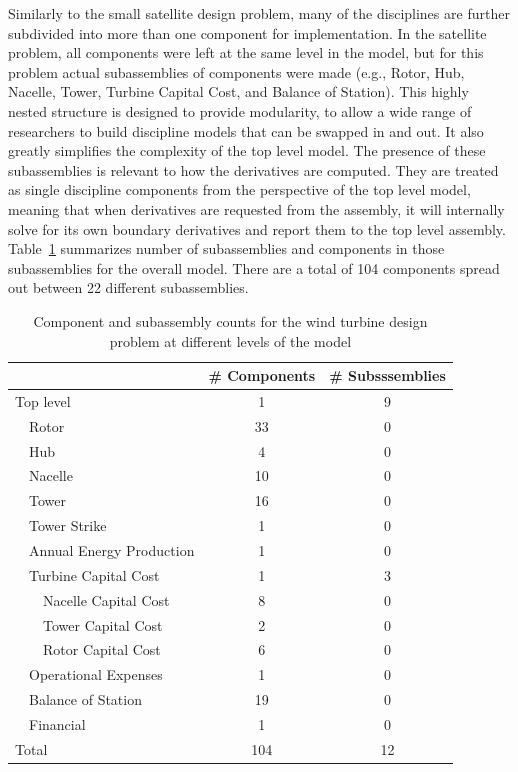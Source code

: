 \documentclass[]{aiaa-tc} %
\begin{document}
    Similarly to the small satellite design problem, many of the disciplines are further
    subdivided into more than one component for implementation. In the
    satellite problem, all components were left at the same level in the model, but for this problem
    actual subassemblies of components were made (e.g., Rotor, Hub, Nacelle, Tower, Turbine Capital Cost,
    and Balance of Station). This highly nested structure is designed to provide modularity,
    to allow a wide range of researchers to build discipline models that can be swapped in and out.
    It also greatly simplifies the complexity of the top level model.
    The presence of these subassemblies is relevant to how the derivatives are computed.
    They are treated as single discipline components from the perspective of the top level model,
    meaning that when derivatives are requested from the assembly, it will internally solve
    for its own boundary derivatives and report them to the top level assembly. Table~\ref{tab:wt_comp_counts}
    summarizes number of subassemblies and components in those subassemblies for the overall model. There
    are a total of 104 components spread out between 22 different subassemblies.

    \begin{table}\centering
      \caption{Component and subassembly counts for the wind turbine design problem at different levels of
      the model}
      \label{tab:wt_comp_counts}
      \begin{tabular}{l c c}
      \toprule
             & \# Components & \# Subsssemblies \\
      \midrule
      Top level & 1 & 9\\
      \ \  Rotor & 33 & 0\\
      \ \  Hub & 4 & 0\\
      \ \  Nacelle & 10 & 0 \\
      \ \  Tower & 16 & 0\\
      \ \ Tower Strike & 1 & 0 \\
      \ \  Annual Energy Production & 1 & 0 \\
      \ \  Turbine Capital Cost & 1 & 3  \\
      \ \ \ \ Nacelle Capital Cost & 8 & 0  \\
      \ \ \ \ Tower Capital Cost & 2 & 0 \\
      \ \ \ \ Rotor Capital Cost & 6 & 0  \\
      \ \  Operational Expenses & 1 & 0  \\
      \ \  Balance of Station & 19 & 0 \\
      \ \  Financial & 1 & 0 \\
      \hline
      Total & 104 & 12 \\

      \bottomrule
      \end{tabular}
    \end{table}
\end{document}
